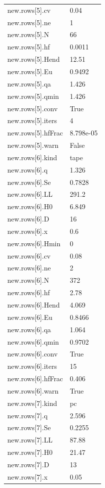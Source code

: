 {\begin{longtable}{p{}p{}}
{}new.rows[5].cv & 0.04\\
{}new.rows[5].ne & 1\\
{}new.rows[5].N & 66\\
{}new.rows[5].hf & 0.0011\\
{}new.rows[5].Hend & 12.51\\
{}new.rows[5].Eu & 0.9492\\
{}new.rows[5].qa & 1.426\\
{}new.rows[5].qmin & 1.426\\
{}new.rows[5].conv & True\\
{}new.rows[5].iters & 4\\
{}new.rows[5].hfFrac & 8.798e-05\\
{}new.rows[5].warn & False\\
{}new.rows[6].kind & tape\\
{}new.rows[6].q & 1.326\\
{}new.rows[6].Se & 0.7828\\
{}new.rows[6].LL & 291.2\\
{}new.rows[6].H0 & 6.849\\
{}new.rows[6].D & 16\\
{}new.rows[6].x & 0.6\\
{}new.rows[6].Hmin & 0\\
{}new.rows[6].cv & 0.08\\
{}new.rows[6].ne & 2\\
{}new.rows[6].N & 372\\
{}new.rows[6].hf & 2.78\\
{}new.rows[6].Hend & 4.069\\
{}new.rows[6].Eu & 0.8466\\
{}new.rows[6].qa & 1.064\\
{}new.rows[6].qmin & 0.9702\\
{}new.rows[6].conv & True\\
{}new.rows[6].iters & 15\\
{}new.rows[6].hfFrac & 0.406\\
{}new.rows[6].warn & True\\
{}new.rows[7].kind & pc\\
{}new.rows[7].q & 2.596\\
{}new.rows[7].Se & 0.2255\\
{}new.rows[7].LL & 87.88\\
{}new.rows[7].H0 & 21.47\\
{}new.rows[7].D & 13\\
{}new.rows[7].x & 0.05\\

\end{longtable}}
